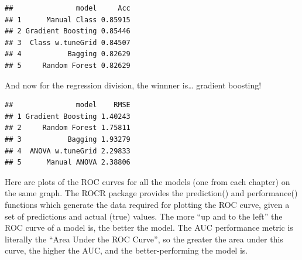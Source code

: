 \documentclass[
]{book}
\newenvironment{Shaded}{\begin{snugshade}}{\end{snugshade}}
\newcommand{\DataTypeTok}[1]{\textcolor[rgb]{0.13,0.29,0.53}{#1}}
\newcommand{\DecValTok}[1]{\textcolor[rgb]{0.00,0.00,0.81}{#1}}
\newcommand{\KeywordTok}[1]{\textcolor[rgb]{0.13,0.29,0.53}{\textbf{#1}}}
\newcommand{\NormalTok}[1]{#1}
\newcommand{\OperatorTok}[1]{\textcolor[rgb]{0.81,0.36,0.00}{\textbf{#1}}}
\newcommand{\StringTok}[1]{\textcolor[rgb]{0.31,0.60,0.02}{#1}}
\begin{document}
\begin{verbatim}
##               model     Acc
## 1      Manual Class 0.85915
## 2 Gradient Boosting 0.85446
## 3  Class w.tuneGrid 0.84507
## 4           Bagging 0.82629
## 5     Random Forest 0.82629
\end{verbatim}

And now for the regression division, the winnner is\ldots{} gradient boosting!

\begin{Shaded}
\end{Shaded}

\begin{verbatim}
##               model    RMSE
## 1 Gradient Boosting 1.40243
## 2     Random Forest 1.75811
## 3           Bagging 1.93279
## 4  ANOVA w.tuneGrid 2.29833
## 5      Manual ANOVA 2.38806
\end{verbatim}

Here are plots of the ROC curves for all the models (one from each chapter) on the same graph. The ROCR package provides the prediction() and performance() functions which generate the data required for plotting the ROC curve, given a set of predictions and actual (true) values.
The more ``up and to the left'' the ROC curve of a model is, the better the model. The AUC performance metric is literally the ``Area Under the ROC Curve'', so the greater the area under this curve, the higher the AUC, and the better-performing the model is.
\end{document}
